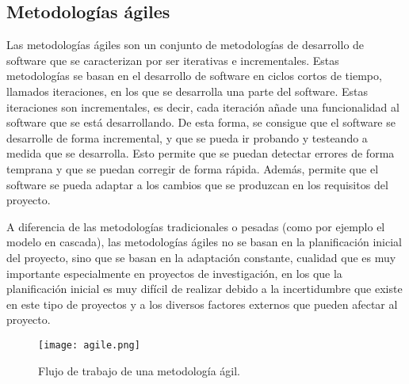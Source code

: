 \subsection{Metodologías ágiles}
Las metodologías ágiles son un conjunto de metodologías de desarrollo de software
que se caracterizan por ser iterativas e incrementales. Estas metodologías se
basan en el desarrollo de software en ciclos cortos de tiempo, llamados
iteraciones, en los que se desarrolla una parte del software. Estas iteraciones
son incrementales, es decir, cada iteración añade una funcionalidad al software
que se está desarrollando. De esta forma, se consigue que el software se
desarrolle de forma incremental, y que se pueda ir probando y testeando a medida
que se desarrolla. Esto permite que se puedan detectar errores de forma temprana
y que se puedan corregir de forma rápida. Además, permite que el software se
pueda adaptar a los cambios que se produzcan en los requisitos del proyecto.\medskip

A diferencia de las metodologías tradicionales o pesadas\cite*{Jose_1634898355000} 
(como por ejemplo el modelo en cascada), las metodologías ágiles no se basan en la planificación
inicial del proyecto, sino que se basan en la adaptación constante, cualidad
que es muy importante especialmente en proyectos de investigación, en los que
la planificación inicial es muy difícil de realizar debido a la incertidumbre
que existe en este tipo de proyectos y a los diversos factores externos que
pueden afectar al proyecto.

\begin{figure}[ht]
    \centering
    \texttt{[image: agile.png]}
    \caption{Flujo de trabajo de una metodología ágil.}
    \label{fig:agile}
\end{figure}
